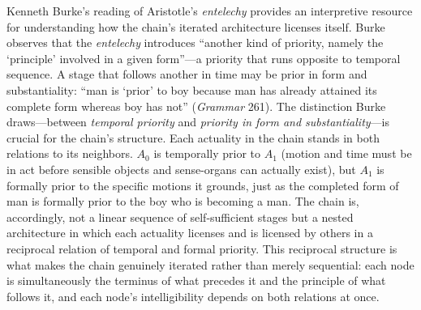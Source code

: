 \documentclass{article}
\begin{document}
Kenneth Burke's reading of Aristotle's \textit{entelechy} provides an interpretive resource for understanding how the chain's iterated architecture licenses itself. Burke observes that the \textit{entelechy} introduces ``another kind of priority, namely the `principle' involved in a given form''---a priority that runs opposite to temporal sequence. A stage that follows another in time may be prior in form and substantiality: ``man is `prior' to boy because man has already attained its complete form whereas boy has not'' (\textit{Grammar} 261). The distinction Burke draws---between \textit{temporal priority} and \textit{priority in form and substantiality}---is crucial for the chain's structure. Each actuality in the chain stands in both relations to its neighbors. $A_0$ is temporally prior to $A_1$ (motion and time must be in act before sensible objects and sense-organs can actually exist), but $A_1$ is formally prior to the specific motions it grounds, just as the completed form of man is formally prior to the boy who is becoming a man. The chain is, accordingly, not a linear sequence of self-sufficient stages but a nested architecture in which each actuality licenses and is licensed by others in a reciprocal relation of temporal and formal priority. This reciprocal structure is what makes the chain genuinely iterated rather than merely sequential: each node is simultaneously the terminus of what precedes it and the principle of what follows it, and each node's intelligibility depends on both relations at once.
\end{document}

